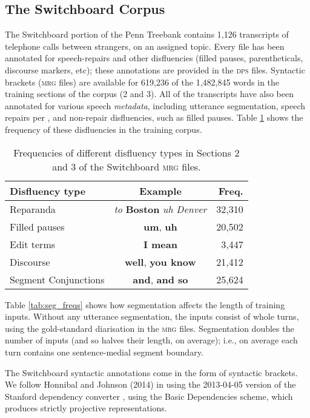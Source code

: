 \documentclass[11pt,letterpaper]{article}
\begin{document}
\newpage
\subsection{The Switchboard Corpus}
\label{sec:swbd}

The Switchboard portion of the Penn Treebank \citep{marcus:93} contains 1,126
transcripts of telephone calls between strangers, on an assigned topic.
Every file has been annotated for speech-repairs and other disfluencies (filled
pauses, parentheticals, discourse markers, etc); these annotations are provided
in the \textsc{dps} files.  Syntactic brackets (\textsc{mrg} files) are available
for 619,236 of the 1,482,845 words in the training sections of the corpus (2 and 3). 
All of the transcripts have also been annotated for various speech \emph{metadata},
including utterance segmentation, speech repairs per \citet{shriberg:94}, and 
non-repair disfluencies, such as filled pauses.  Table \ref{tab:dfl_freqs} shows the
frequency of these disfluencies in the training corpus.

\begin{table}
    \centering
    \small
    \begin{tabular}{lc|r}
\hline
Disfluency type & Example & Freq. \\
\hline \hline
Reparanda & \emph{to } \textbf{Boston} \emph{uh Denver} & 32,310 \\
Filled pauses    & \textbf{um}, \textbf{uh} & 20,502 \\
Edit terms & \textbf{I mean} & 3,447 \\ 
Discourse  & \textbf{well}, \textbf{you know} & 21,412  \\
Segment Conjunctions & \textbf{and}, \textbf{and so} & 25,624 \\
\hline
\end{tabular}
\caption{\small Frequencies of different disfluency types in Sections 2 and 3 of the
Switchboard \textsc{mrg} files.\label{tab:dfl_freqs}}
\vspace*{-0.5in}
\end{table}

Table \ref{tab:seg_freqs} shows how segmentation affects the length of training
inputs.  Without any utterance segmentation, the inputs consist of whole turns,
using the gold-standard diarisation in the \textsc{mrg} files.
Segmentation doubles the number of inputs (and so halves their length, on average);
i.e., on average each turn contains one sentence-medial segment boundary.

The Switchboard syntactic annotations come in the form of syntactic brackets.
We follow Honnibal and Johnson (2014) in using
the 2013-04-05 version of the Stanford dependency converter \citep{stanford_deps},
using the Basic Dependencies scheme,
which produces strictly projective representations.
\end{document}

